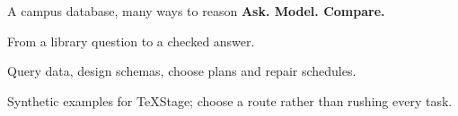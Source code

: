 \begin{frame}[t]{A campus database, many ways to reason}
{\huge\bfseries Ask. Model. Compare.}\par
\vspace{7mm}\large From a library question to a checked answer.\par
\vspace{6mm}\normalsize Query data, design schemas, choose plans and repair schedules.\par
\vfill Synthetic examples for TeXStage; choose a route rather than rushing every task.
\end{frame}
